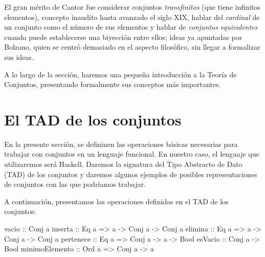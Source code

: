 El gran mérito de Cantor fue considerar conjuntos \textit{transfinitos} (que
tiene infinitos elementos), concepto inaudito hasta avanzado el siglo XIX,
hablar del \textit{cardinal} de un conjunto como el número de sus elementos y
hablar de \textit{conjuntos equivalentes} cuando puede establecerse una
biyección entre ellos; ideas ya apuntadas por Bolzano, quien se centró
demasiado en el aspecto filosófico, sin llegar a formalizar sus ideas.

A lo largo de la sección, haremos una pequeña introducción a la Teoría de
Conjuntos, presentando formalmente sus conceptos más importantes.




\section{El TAD de los conjuntos}

\label{sec:TAD_conjuntos}

En la presente sección, se defininen las operaciones básicas necesarias
para trabajar con conjuntos en un lenguaje funcional. En nuestro caso, 
el lenguaje que utilizaremos será Haskell. Daremos la signatura del Tipo
Abstracto de Dato (TAD) de los conjuntos y daremos algunos ejemplos de 
posibles representaciones de conjuntos con las que podríamos trabajar.

A continuación, presentamos las operaciones definidas en el TAD de los 
conjuntos:

\begin{code}
vacio          :: Conj a                         
inserta        :: Eq a => a -> Conj a -> Conj a
elimina        :: Eq a => a -> Conj a -> Conj a
pertenece      :: Eq a => Conj a -> a -> Bool  
esVacio        :: Conj a -> Bool
minimoElemento :: Ord a => Conj a -> a
\end{code}

